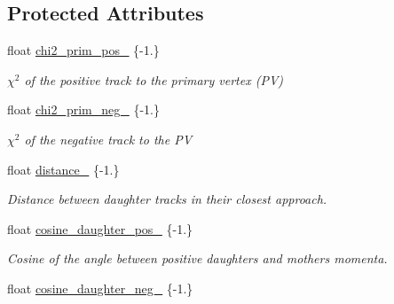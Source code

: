 \subsection*{Protected Attributes}
\begin{DoxyCompactItemize}
\item 
float \hyperlink{classOutputContainer_aa382f97a717ece6c6d6ed6d34a4662d5}{chi2\+\_\+prim\+\_\+pos\+\_\+} \{-\/1.\}\hypertarget{classOutputContainer_aa382f97a717ece6c6d6ed6d34a4662d5}{}\label{classOutputContainer_aa382f97a717ece6c6d6ed6d34a4662d5}

\begin{DoxyCompactList}\small\item\em $\chi^2$ of the positive track to the primary vertex (PV) \end{DoxyCompactList}\item 
float \hyperlink{classOutputContainer_a20fe4406dabdd8400eb854476893d50e}{chi2\+\_\+prim\+\_\+neg\+\_\+} \{-\/1.\}\hypertarget{classOutputContainer_a20fe4406dabdd8400eb854476893d50e}{}\label{classOutputContainer_a20fe4406dabdd8400eb854476893d50e}

\begin{DoxyCompactList}\small\item\em $\chi^2$ of the negative track to the PV \end{DoxyCompactList}\item 
float \hyperlink{classOutputContainer_a118c01c668f399160b03505dc72e2681}{distance\+\_\+} \{-\/1.\}\hypertarget{classOutputContainer_a118c01c668f399160b03505dc72e2681}{}\label{classOutputContainer_a118c01c668f399160b03505dc72e2681}

\begin{DoxyCompactList}\small\item\em Distance between daughter tracks in their closest approach. \end{DoxyCompactList}\item 
float \hyperlink{classOutputContainer_a0f5852926f15520eb364bdc2d38adbfe}{cosine\+\_\+daughter\+\_\+pos\+\_\+} \{-\/1.\}\hypertarget{classOutputContainer_a0f5852926f15520eb364bdc2d38adbfe}{}\label{classOutputContainer_a0f5852926f15520eb364bdc2d38adbfe}

\begin{DoxyCompactList}\small\item\em Cosine of the angle between positive daughter\textquotesingle{}s and mother\textquotesingle{}s momenta. \end{DoxyCompactList}\item 
float \hyperlink{classOutputContainer_af95f6a86c75f89708db4ec1e13ab527f}{cosine\+\_\+daughter\+\_\+neg\+\_\+} \{-\/1.\}\hypertarget{classOutputContainer_af95f6a86c75f89708db4ec1e13ab527f}{}\label{classOutputContainer_af95f6a86c75f89708db4ec1e13ab527f}


\end{DoxyCompactItemize}
